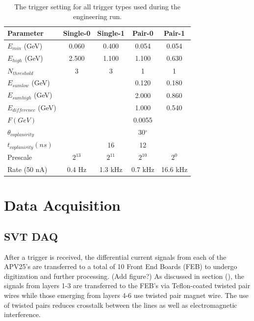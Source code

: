 \begin{table}
    \centering
    \begin{tabular}{lcccc}
        \toprule
        \textbf{Parameter} & \textbf{Single-0} & \textbf{Single-1} & \textbf{Pair-0} & \textbf{Pair-1} \\
        \midrule
        \midrule
        $E_{min}$ (GeV)      & 0.060 & 0.400 & 0.054 & 0.054 \\
        $E_{high}$ (GeV)     & 2.500 & 1.100 & 1.100 & 0.630 \\
        $N_{threshold}$      & 3     & 3     & 1     & 1     \\
        $E_{sum low}$ (GeV)  &       &       & 0.120 & 0.180 \\
        $E_{sum high}$ (GeV) &       &       & 2.000 & 0.860 \\
        $E_{differenec}$ (GeV) &       &       & 1.000 & 0.540 \\
        $F (GeV)$ & & & 0.0055 \\
        $\theta_{coplanirity}$ & & & 30$^\circ$ \\
        $t_{coplanirity} (ns)$ & & 16 & 12 \\
        Prescale & $2^{13}$ & $2^{11}$ & $2^{10}$ & $2^{0}$ \\
        Rate (50 nA) & 0.4 Hz & 1.3 kHz & 0.7 kHz & 16.6 kHz \\
        \bottomrule
    \end{tabular}
    \caption{The trigger setting for all trigger types used during the 
             engineering run.}
    \label{tab:triggers}
\end{table}


\section{Data Acquisition}



\subsection{SVT DAQ}

After a trigger is received, the differential current signals 
from each of the APV25's are transferred to a total of 10 Front End Boards (FEB)
to undergo digitization and further processing. (Add figure?) As discussed in 
section (), the signals from layers 1-3 are transferred to the FEB's via 
Teflon-coated twisted pair wires while those emerging from
layers 4-6 use twisted pair magnet wire.  The use of twisted pairs reduces
crosstalk between the lines as well as electromagnetic interference.

